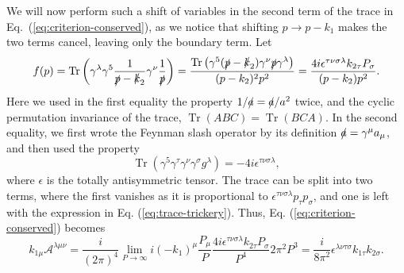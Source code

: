 We will now perform such a shift of variables in the second term of the trace in Eq.~(\ref{eq:criterion-conserved}), as we notice that shifting $p \to p-k_1$ makes the two terms cancel, leaving only the boundary term.
Let
\begin{equation}
  \label{eq:trace-trickery}
  f(p) = \operatorname{Tr}\left(
  \gamma ^{\lambda }\gamma ^5 \frac{1}{\slashed{p} - \slashed{k}_2} \gamma ^{\nu } \frac{1}{\slashed{p}}
  \right)
  = \frac{\operatorname{Tr}\left(
  \gamma ^5 (\slashed{p}-\slashed{k}_2) \gamma ^{\nu }\slashed{p}\gamma ^{\lambda }
\right)}{
(p-k_2)^2 p^2}
= \frac{{4 i \epsilon ^{\tau \nu \sigma \lambda } k_{2\tau }P_{\sigma }}}{(p-k_2) p^2}.
\end{equation}
Here we used in the first equality the property $1 /\slashed{a} = \slashed{a} /a^2$ twice, and the cyclic permutation invariance of the trace, $\operatorname{Tr}(ABC) = \operatorname{Tr}(BCA)$.
In the second equality, we first wrote the Feynman slash operator by its definition $\slashed{a}=\gamma ^{\mu }a_{\mu }$, and then used the property
\begin{equation}
  \label{eq:trace-gamma}
  \operatorname{Tr}(\gamma ^5\gamma ^{\tau }\gamma ^{\nu }\gamma ^{\sigma }g^{\lambda }) = -4i\epsilon ^{\tau \nu \sigma \lambda },
\end{equation}
where $\epsilon $ is the totally antisymmetric tensor.
The trace can be split into two terms, where the first vanishes as it is proportional to $\epsilon ^{\tau \nu \sigma \lambda }p_{\tau }p_{\sigma }$, and one is left with the expression in Eq. (\ref{eq:trace-trickery}).
Thus, Eq. (\ref{eq:criterion-conserved}) becomes
\begin{equation}
  \label{eq:criterion-conserved-simp}
  k_{1\mu } \mathcal{A}^{\lambda \mu \nu } =
  \frac{i}{(2\pi)^{4}} \lim_{P\to \infty } i(-k_1)^{\mu } \frac{P_{\mu }}{P}
  \frac{{4 i \epsilon ^{\tau \nu \sigma \lambda } k_{2\tau } P_{\sigma }}}{P^{4}} 2\pi^2 P^3
  = \frac{i}{8\pi^2} \epsilon ^{\lambda \nu \tau \sigma } k_{1\tau }k_{2\sigma }.
\end{equation}

